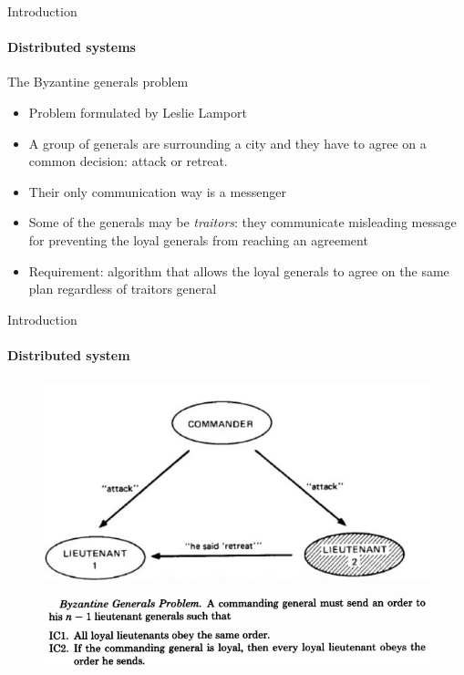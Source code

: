 \documentclass{beamer}
\begin{document}
  \begin{frame}{Introduction}
    \framesubtitle{Distributed systems}
        \begin{block}{The Byzantine generals problem}
          \begin{itemize}
            \item Problem formulated by Leslie Lamport \cite{lamport1982byzantine}
            \item A group of generals are surrounding a city and they have to agree
            on a common decision: attack or retreat.
            \item Their only communication way is a messenger
            \item Some of the generals may be \emph{traitors}: they communicate
            misleading message for preventing the loyal generals from reaching an
            agreement
            \item Requirement: algorithm that allows the loyal generals to agree
            on the same plan regardless of traitors general
          \end{itemize}
        \end{block}
\end{frame}

\begin{frame}{Introduction}
    \framesubtitle{Distributed system}
    \begin{figure}[!htb]
            \centering
            \includegraphics[width=0.5\linewidth]{../img/byzantine.jpg}
    \end{figure}
    \begin{figure}
        \centering
        \includegraphics[width=0.7\linewidth]{../img/byzantine-generals-problem.png}
    \end{figure}
\end{frame}
\end{document}
